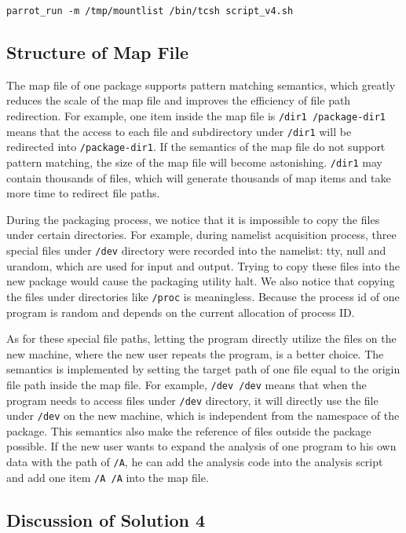 \documentclass{sig-alternate}
\begin{document}
{\tt parrot\_run -m /tmp/mountlist /bin/tcsh script\_v4.sh}

\subsection{Structure of Map File} 

The map file of one package supports pattern matching semantics,
which greatly reduces the scale of the map file and improves the efficiency of file path redirection. 
For example,
one item inside the map file is {\tt /dir1 /package-dir1} means that the access to each file and
subdirectory under {\tt /dir1} will be redirected into {\tt /package-dir1}.
If the semantics of the map file do not support pattern matching, the size of the map file will become astonishing. 
{\tt /dir1} may contain thousands of files, which will generate thousands of map items and take more time to redirect file paths.

During the packaging process, we notice
that it is impossible to copy the files under certain directories.
For example, during namelist acquisition process, three special files under {\tt /dev} directory were recorded into the namelist: tty, null and urandom, which are used for input and output.
Trying to copy these files into the new package would cause the packaging utility halt.
We also notice that copying the files under directories like {\tt /proc} is
meaningless. Because the process id of one program is random and depends on the
current allocation of process ID. 

As for these special file paths, letting
the program directly utilize the files on the new machine, where the new user
repeats the program, is a better choice. The semantics is implemented by
setting the target path of one file equal to the origin file path inside the
map file. For example, {\tt /dev /dev} means that when the program needs to access
files under {\tt /dev} directory, it will directly use the file under {\tt /dev} on the new machine, which is
independent from the namespace of the package. This semantics also make the
reference of files outside the package possible. If the new user wants to
expand the analysis of one program to his own data with the path of {\tt /A}, he can add the analysis
code into the analysis script and add one item {\tt /A /A} into the map file.


\subsection{Discussion of Solution 4} 
\end{document}
